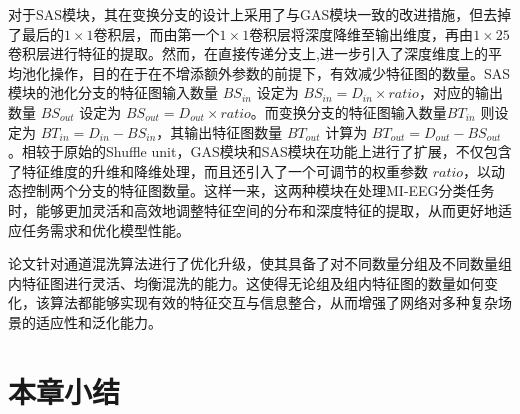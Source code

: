 对于SAS模块，其在变换分支的设计上采用了与GAS模块一致的改进措施，但去掉了最后的\(1\times1\)卷积层，而由第一个\(1\times1\)卷积层将深度降维至输出维度，再由\(1\times25\)卷积层进行特征的提取。然而，在直接传递分支上,进一步引入了深度维度上的平均池化操作，目的在于在不增添额外参数的前提下，有效减少特征图的数量。SAS模块的池化分支的特征图输入数量 \(BS_{in}\) 设定为 \(BS_{in} = D_{in} \times ratio\)，对应的输出数量 \(BS_{out}\) 设定为 \(BS_{out} = D_{out} \times ratio\)。而变换分支的特征图输入数量\(BT_{in}\) 则设定为 \(BT_{in} = D_{in} - BS_{in}\)，其输出特征图数量 \(BT_{out}\) 计算为 \(BT_{out} = D_{out} - BS_{out}\)。相较于原始的Shuffle unit，GAS模块和SAS模块在功能上进行了扩展，不仅包含了特征维度的升维和降维处理，而且还引入了一个可调节的权重参数  \(ratio\)，以动态控制两个分支的特征图数量。这样一来，这两种模块在处理MI-EEG分类任务时，能够更加灵活和高效地调整特征空间的分布和深度特征的提取，从而更好地适应任务需求和优化模型性能。

论文针对通道混洗算法进行了优化升级，使其具备了对不同数量分组及不同数量组内特征图进行灵活、均衡混洗的能力。这使得无论组及组内特征图的数量如何变化，该算法都能够实现有效的特征交互与信息整合，从而增强了网络对多种复杂场景的适应性和泛化能力。

\section{本章小结}